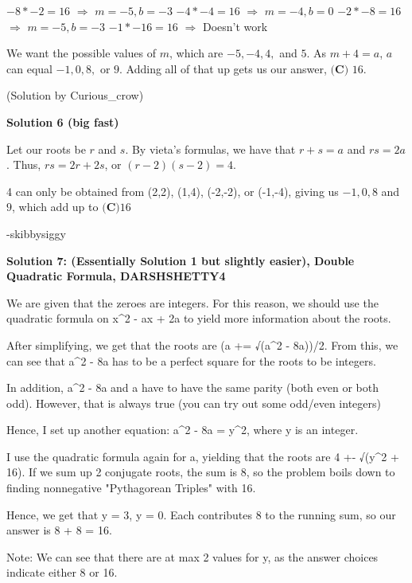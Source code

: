 \begin{enumerate}
 $-8*-2=16$ $\Rightarrow$ $m=-5, b=-3$
$-4*-4=16$ $\Rightarrow$ $m=-4, b=0$
$-2*-8=16$ $\Rightarrow$ $m=-5, b=-3$
$-1*-16=16$ $\Rightarrow$ Doesn't work

 
We want the possible values of $m$, which are $-5,-4,4,$ and $5$. As $m+4=a$, $a$ can equal $-1,0,8,$ or $9.$ Adding all of that up gets us our answer, $\boxed{\textbf{(C) }16}$.

 
(Solution by Curious\_crow)

 



\textbf{Solution 6 (big fast)}

Let our roots be $r$ and $s$. By vieta's formulas, we have that $r+s=a$ and $rs = 2a$. Thus, $rs = 2r+2s$, or $(r-2)(s-2) = 4$. 

 4 can only be obtained from (2,2), (1,4), (-2,-2), or (-1,-4), giving us $-1,0,8$ and $9$, which add up to $\boxed{\textbf{(C)}16}$

 -skibbysiggy

 



\textbf{Solution 7: (Essentially Solution 1 but slightly easier), Double Quadratic Formula, DARSHSHETTY4}

We are given that the zeroes are integers. For this reason, we should use the quadratic formula on x\textasciicircum{}2 - ax + 2a to yield more information about the roots. 

 After simplifying, we get that the roots are (a += √(a\textasciicircum{}2 - 8a))/2. From this, we can see that a\textasciicircum{}2 - 8a has to be a perfect square for the roots to be integers. 

 In addition, a\textasciicircum{}2 - 8a and a have to have the same parity (both even or both odd). However, that is always true (you can try out some odd/even integers)

 Hence, I set up another equation: a\textasciicircum{}2 - 8a = y\textasciicircum{}2, where y is an integer.

 I use the quadratic formula again for a, yielding that the roots are 4 +- √(y\textasciicircum{}2 + 16). If we sum up 2 conjugate roots, the sum is 8, so the problem boils down to finding nonnegative "Pythagorean Triples" with 16. 

 Hence, we get that y = 3, y = 0. Each contributes 8 to the running sum, so our answer is 8 + 8 = 16.

 Note: We can see that there are at max 2 values for y, as the answer choices indicate either 8 or 16.


\end{enumerate}

